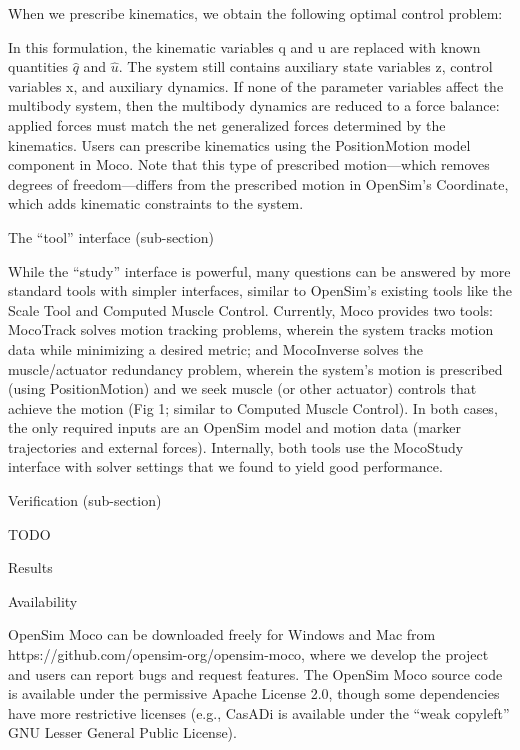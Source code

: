 \documentclass[10pt,letterpaper]{article}
\begin{document}
When we prescribe kinematics, we obtain the following optimal control problem:

In this formulation, the kinematic variables q and u are replaced with known quantities $\hat{q}$ and $\hat{u}$. The system still contains auxiliary state variables z, control variables x, and auxiliary dynamics. If none of the parameter variables affect the multibody system, then the multibody dynamics are reduced to a force balance: applied forces must match the net generalized forces determined by the kinematics. Users can prescribe kinematics using the PositionMotion model component in Moco. Note that this type of prescribed motion—which removes degrees of freedom—differs from the prescribed motion in OpenSim’s Coordinate, which adds kinematic constraints to the system.

The “tool” interface (sub-section)

While the “study” interface is powerful, many questions can be answered by more standard tools with simpler interfaces, similar to OpenSim’s existing tools like the Scale Tool and Computed Muscle Control. Currently, Moco provides two tools: MocoTrack solves motion tracking problems, wherein the system tracks motion data while minimizing a desired metric; and MocoInverse solves the muscle/actuator redundancy problem, wherein the system’s motion is prescribed (using PositionMotion) and we seek muscle (or other actuator) controls that achieve the motion (Fig 1; similar to Computed Muscle Control). In both cases, the only required inputs are an OpenSim model and motion data (marker trajectories and external forces). Internally, both tools use the MocoStudy interface with solver settings that we found to yield good performance.

Verification (sub-section)

TODO

Results



Availability

OpenSim Moco can be downloaded freely for Windows and Mac from https://github.com/opensim-org/opensim-moco, where we develop the project and users can report bugs and request features. The OpenSim Moco source code is available under the permissive Apache License 2.0, though some dependencies have more restrictive licenses (e.g., CasADi is available under the “weak copyleft” GNU Lesser General Public License).
\end{document}
